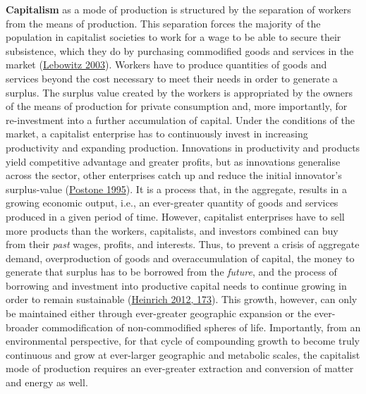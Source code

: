 \documentclass[a4paper, nobind]{templates/ociamthesis}
\begin{document}
\textbf{Capitalism} as a mode of production is structured by the separation of workers from the means of production. This separation forces the majority of the population in capitalist societies to work for a wage to be able to secure their subsistence, which they do by purchasing commodified goods and services in the market (\protect\hyperlink{ref-lebowitz_capital_2003}{Lebowitz 2003}). Workers have to produce quantities of goods and services beyond the cost necessary to meet their needs in order to generate a surplus. The surplus value created by the workers is appropriated by the owners of the means of production for private consumption and, more importantly, for re-investment into a further accumulation of capital. Under the conditions of the market, a capitalist enterprise has to continuously invest in increasing productivity and expanding production. Innovations in productivity and products yield competitive advantage and greater profits, but as innovations generalise across the sector, other enterprises catch up and reduce the initial innovator's surplus-value (\protect\hyperlink{ref-postone_time_1995}{Postone 1995}). It is a process that, in the aggregate, results in a growing economic output, i.e., an ever-greater quantity of goods and services produced in a given period of time. However, capitalist enterprises have to sell more products than the workers, capitalists, and investors combined can buy from their \emph{past} wages, profits, and interests. Thus, to prevent a crisis of aggregate demand, overproduction of goods and overaccumulation of capital, the money to generate that surplus has to be borrowed from the \emph{future}, and the process of borrowing and investment into productive capital needs to continue growing in order to remain sustainable (\protect\hyperlink{ref-heinrich_introduction_2012}{Heinrich 2012, 173}). This growth, however, can only be maintained either through ever-greater geographic expansion or the ever-broader commodification of non-commodified spheres of life. Importantly, from an environmental perspective, for that cycle of compounding growth to become truly continuous and grow at ever-larger geographic and metabolic scales, the capitalist mode of production requires an ever-greater extraction and conversion of matter and energy as well.
\end{document}
